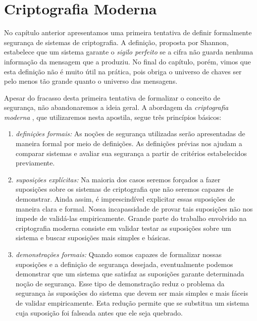 \chapter{Criptografia Moderna}
\label{cha:criptografia-moderna}

No capítulo anterior apresentamos uma primeira tentativa de definir formalmente segurança de sistemas de criptografia.
A definição, proposta por Shannon, estabelece que um sistema garante o {\em sigilo perfeito} se a cifra não guarda nenhuma informação da mensagem que a produziu.
No final do capítulo, porém, vimos que esta definição não é muito útil na prática, pois obriga o universo de chaves ser pelo menos tão grande quanto o universo das mensagens.

Apesar do fracasso desta primeira tentativa de formalizar o conceito de segurança, não abandonaremos a ideia geral.
A abordagem da {\em criptografia moderna} \cite{Goldwasser84}, que utilizaremos nesta apostila, segue três princípios básicos:
\begin{enumerate}
\item {\em definições formais:} As noções de segurança utilizadas serão apresentadas de maneira formal por meio de definições. 
As definições prévias nos ajudam a comparar sistemas e avaliar sua segurança a partir de critérios estabelecidos previamente.
\item {\em suposições explícitas:} Na maioria dos casos seremos forçados a fazer suposições sobre os sistemas de criptografia que não seremos capazes de demonstrar.
Ainda assim, é imprescindível explicitar essas suposições de maneira clara e formal.
Nossa incapassidade de provar tais suposições não nos impede de validá-las empiricamente.
Grande parte do trabalho envolvido na criptografia moderna consiste em validar testar as suposições sobre um sistema e buscar suposições mais simples e básicas.
\item {\em demonstrações formais:} Quando somos capazes de formalizar nossas suposições e a definição de segurança desejada, eventualmente podemos demonstrar que um sistema que satisfaz as suposições garante determinada noção de segurança.
Esse tipo de demonstração reduz o problema da segurança às suposições do sistema que devem ser mais simples e mais fáceis de validar empiricamente.
Esta redução permite que se substitua um sistema cuja suposição foi falseada antes que ele seja quebrado.
\end{enumerate}

